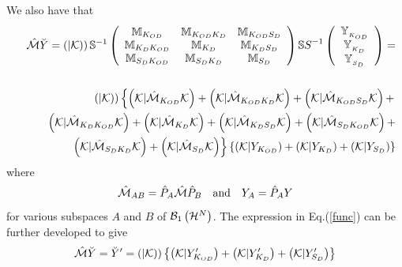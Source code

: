 We also have that 
\begin{eqnarray}
&&{\cal \hat{M}}\breve{Y}=\left( \left| {\cal K}\right) \right) {\Bbb S}%
^{-1}\left( 
\begin{array}{ccc}
{\Bbb M}_{K_{OD}} & {\Bbb M}_{K_{OD}K_{D}} & {\Bbb M}_{K_{OD}S_{D}} \\ 
{\Bbb M}_{K_{D}K_{OD}} & {\Bbb M}_{K_{D}} & {\Bbb M}_{K_{D}S_{D}} \\ 
{\Bbb M}_{S_{D}K_{OD}} & {\Bbb M}_{S_{D}K_{D}} & {\Bbb M}_{S_{D}}%
\end{array}%
\right) {\Bbb SS}^{-1}\left( 
\begin{array}{c}
{\Bbb Y}_{_{K_{OD}}} \\ 
{\Bbb Y}_{_{K_{D}}} \\ 
{\Bbb Y}_{_{S_{D}}}%
\end{array}%
\right) =  \nonumber \\
&&  \nonumber \\
&&\left( \left| {\cal K}\right) \right) \left\{ \left( {\cal K}|{\cal \hat{M}%
}_{K_{OD}}{\cal K}\right) +\left( {\cal K}|{\cal \hat{M}}_{K_{OD}K_{D}}{\cal %
K}\right) +\left( {\cal K}|{\cal \hat{M}}_{K_{OD}S_{D}}{\cal K}\right)
+\right.  \nonumber \\
&&\qquad \left( {\cal K}|{\cal \hat{M}}_{K_{D}K_{OD}}{\cal K}\right) +\left( 
{\cal K}|{\cal \hat{M}}_{K_{D}}{\cal K}\right) +\left( {\cal K}|{\cal \hat{M}%
}_{K_{D}S_{D}}{\cal K}\right) +\left( {\cal K}|{\cal \hat{M}}_{S_{D}K_{OD}}%
{\cal K}\right) +  \nonumber \\
&&\qquad \qquad \left. \left( {\cal K}|{\cal \hat{M}}_{S_{D}K_{D}}{\cal K}%
\right) +\left( {\cal K}|{\cal \hat{M}}_{S_{D}}{\cal K}\right) \right\}
\left\{ \left( {\cal K}|Y_{K_{OD}}\right) +\left( {\cal K}|Y_{K_{D}}\right)
+\left( {\cal K}|Y_{S_{D}}\right) \right\}  \label{func}
\end{eqnarray}%
where 
\begin{equation}
{\cal \hat{M}}_{AB}=\hat{P}_{A}{\cal \hat{M}}\hat{P}_{B}\quad \text{and\quad 
}Y_{A}=\hat{P}_{A}Y
\end{equation}%
for various subspaces $A$ and $B$ of ${\cal B}_{1}\left( {\cal H}^{N}\right) 
$. The expression in Eq.(\ref{func}) can be further developed to give 
\begin{equation}
{\cal \hat{M}}\breve{Y}=\breve{Y}^{\prime }=\left( \left| {\cal K}\right)
\right) \left\{ \left( {\cal K}|Y_{K_{OD}}^{\prime }\right) +\left( {\cal K}%
|Y_{K_{D}}^{\prime }\right) +\left( {\cal K}|Y_{S_{D}}^{\prime }\right)
\right\}
\end{equation}%
